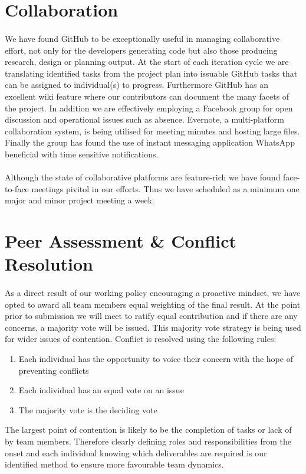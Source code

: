 \documentclass[11pt,a4paper]{article}
\begin{document}
\section{Collaboration}
\paragraph{}
We have found GitHub to be exceptionally useful in managing collaborative effort, not only for the developers generating code but also those producing research, design or planning output.  At the start of each iteration cycle we are translating identified tasks from the project plan into issuable GitHub tasks that can be assigned to individual(s) to progress.  Furthermore GitHub has an excellent wiki feature where our contributors can document the many facets of the project.
\newline
In addition we are effectively employing a Facebook group for open discussion and operational issues such as absence.  Evernote, a multi-platform collaboration system, is being utilised for meeting minutes and hosting large files.  Finally the group has found the use of instant messaging application WhatsApp beneficial with time sensitive notifications.
\paragraph{}
Although the state of collaborative platforms are feature-rich we have found face-to-face meetings pivitol in our efforts.  Thus we have scheduled as a minimum one major and minor project meeting a week.

\section{Peer Assessment \& Conflict Resolution}
\paragraph{}
As a direct result of our working policy encouraging a proactive mindset, we have opted to award all team members equal weighting of the final result.  At the point prior to submission we will meet to ratify equal contribution and if there are any concerns, a majority vote will be issued.
This majority vote strategy is being used for wider issues of contention.  Conflict is resolved using the following rules:

\begin{enumerate}
  \item Each individual has the opportunity to voice their concern with the hope of preventing conflicts
  \item Each individual has an equal vote on an issue
  \item The majority vote is the deciding vote
\end{enumerate}

The largest point of contention is likely to be the completion of tasks or lack of by team members.  Therefore clearly defining roles and responsibilities from the onset and each individual knowing which deliverables are required is our identified method to ensure more favourable team dynamics.
\end{document}
